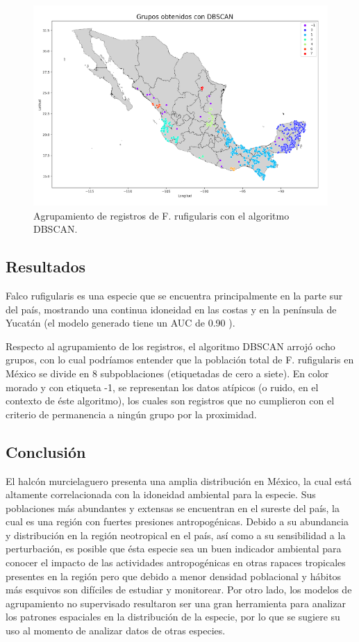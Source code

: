 \documentclass[
]{article}
\begin{document}
\begin{figure}
\centering
\includegraphics{./MAP.png}
\caption{Agrupamiento de registros de F. rufigularis con el algoritmo
DBSCAN.}
\end{figure}

\hypertarget{resultados}{%
\subsection{Resultados}\label{resultados}}

Falco rufigularis es una especie que se encuentra principalmente en la
parte sur del país, mostrando una continua idoneidad en las costas y en
la península de Yucatán (el modelo generado tiene un AUC de 0.90 ).

Respecto al agrupamiento de los registros, el algoritmo DBSCAN arrojó
ocho grupos, con lo cual podríamos entender que la población total de F.
rufigularis en México se divide en 8 subpoblaciones (etiquetadas de cero
a siete). En color morado y con etiqueta -1, se representan los datos
atípicos (o ruido, en el contexto de éste algoritmo), los cuales son
registros que no cumplieron con el criterio de permanencia a ningún
grupo por la proximidad.

\hypertarget{conclusiuxf3n}{%
\subsection{Conclusión}\label{conclusiuxf3n}}

El halcón murcielaguero presenta una amplia distribución en México, la
cual está altamente correlacionada con la idoneidad ambiental para la
especie. Sus poblaciones más abundantes y extensas se encuentran en el
sureste del país, la cual es una región con fuertes presiones
antropogénicas. Debido a su abundancia y distribución en la región
neotropical en el país, así como a su sensibilidad a la perturbación, es
posible que ésta especie sea un buen indicador ambiental para conocer el
impacto de las actividades antropogénicas en otras rapaces tropicales
presentes en la región pero que debido a menor densidad poblacional y
hábitos más esquivos son difíciles de estudiar y monitorear. Por otro
lado, los modelos de agrupamiento no supervisado resultaron ser una gran
herramienta para analizar los patrones espaciales en la distribución de
la especie, por lo que se sugiere su uso al momento de analizar datos de
otras especies.
\end{document}
